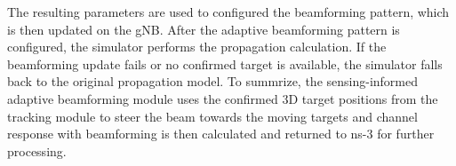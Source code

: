 The resulting parameters are used to configured the beamforming pattern, which is then updated on the gNB.
After the adaptive beamforming pattern is configured, the simulator performs the propagation calculation.
If the beamforming update fails or no confirmed target is available, the simulator falls back to the original propagation model.
To summrize, the sensing-informed adaptive beamforming module uses the confirmed 3D target positions from the tracking module to steer the beam towards the moving targets and channel response with beamforming is then calculated and returned to ns-3 for further processing.